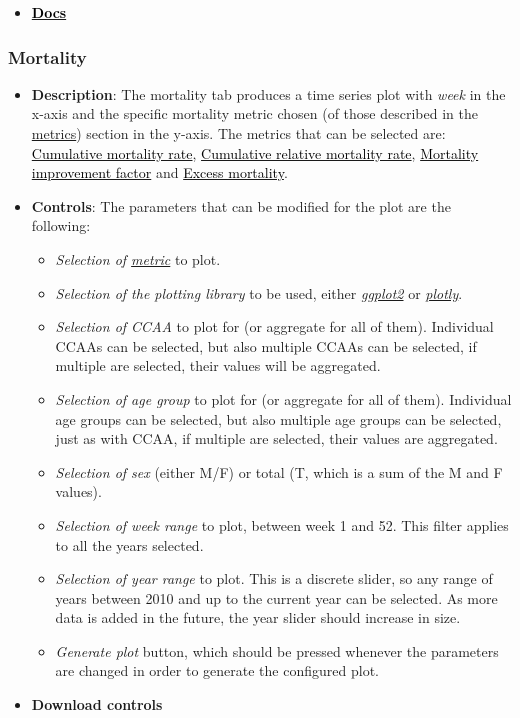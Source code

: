 \documentclass[
  a4paper]{article}
\providecommand{\tightlist}{%
  \setlength{\itemsep}{0pt}\setlength{\parskip}{0pt}}
\begin{document}
\begin{itemize}
\tightlist
\item
  \protect\hyperlink{DocsLayout}{\textcolor{black}{\textbf{Docs}}}
\end{itemize}

\hypertarget{MortalityLayout}{%
\subsubsection{Mortality}\label{MortalityLayout}}

\begin{itemize}
\item
  \textbf{Description}: The mortality tab produces a time series plot
  with \emph{week} in the x-axis and the specific mortality metric
  chosen (of those described in the
  \protect\hyperlink{Metrics}{metrics}) section in the y-axis. The
  metrics that can be selected are:
  \protect\hyperlink{CMR}{\textcolor{black}{Cumulative mortality rate}},
  \protect\hyperlink{CRMR}{\textcolor{black}{Cumulative relative
  mortality rate}}, \protect\hyperlink{CMIF}{\textcolor{black}{Mortality
  improvement factor}} and
  \protect\hyperlink{EM}{\textcolor{black}{Excess mortality}}.
\item
  \textbf{Controls}: The parameters that can be modified for the plot
  are the following:

  \begin{itemize}
  \tightlist
  \item
    \emph{Selection of \protect\hyperlink{Metrics}{metric}} to plot.
  \item
    \emph{Selection of the plotting library} to be used, either
    \href{https://ggplot2.tidyverse.org/}{\emph{ggplot2}} or
    \href{https://plotly.com/r/}{\emph{plotly}}.
  \item
    \emph{Selection of CCAA} to plot for (or aggregate for all of them).
    Individual CCAAs can be selected, but also multiple CCAAs can be
    selected, if multiple are selected, their values will be aggregated.
  \item
    \emph{Selection of age group} to plot for (or aggregate for all of
    them). Individual age groups can be selected, but also multiple age
    groups can be selected, just as with CCAA, if multiple are selected,
    their values are aggregated.
  \item
    \emph{Selection of sex} (either M/F) or total (T, which is a sum of
    the M and F values).
  \item
    \emph{Selection of week range} to plot, between week 1 and 52. This
    filter applies to all the years selected.
  \item
    \emph{Selection of year range} to plot. This is a discrete slider,
    so any range of years between 2010 and up to the current year can be
    selected. As more data is added in the future, the year slider
    should increase in size.
  \item
    \emph{Generate plot} button, which should be pressed whenever the
    parameters are changed in order to generate the configured plot.
  \end{itemize}
\item
  \textbf{Download controls}


\end{itemize}
\end{document}
